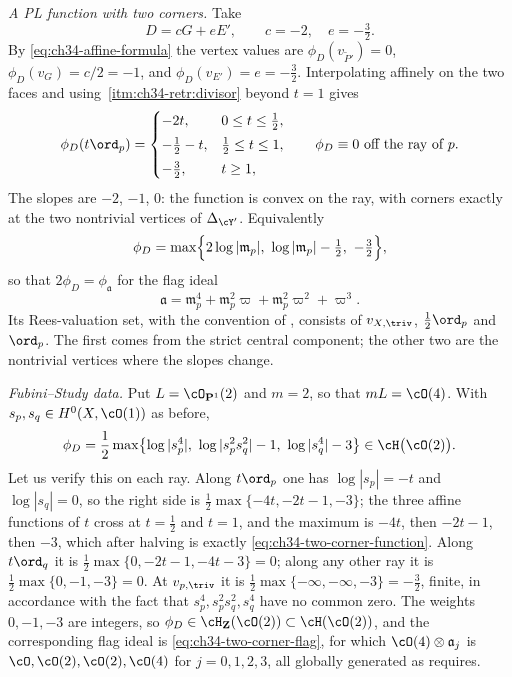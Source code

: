 \begin{example}
\emph{A PL function with two corners.}  Take
\[
 D=cG+eE',
 \qquad
 c=-2,\quad e=-\tfrac32 .
\]
By \eqref{eq:ch34-affine-formula} the vertex values are
$\phi_D(v_{\widetilde P'})=0$, $\phi_D(v_G)=c/2=-1$, and
$\phi_D(v_{E'})=e=-\tfrac32$.  Interpolating affinely on the two faces and
using \,\cref{itm:ch34-retr:divisor} beyond
$t=1$ gives
\begin{equation}
\label{eq:ch34-two-corner-function}
 \phi_D(t\ord_p)=
 \begin{cases}
 -2t,&0\le t\le\tfrac12,\\[1mm]
 -\tfrac12-t,&\tfrac12\le t\le1,\\[1mm]
 -\tfrac32,&t\ge1,
 \end{cases}
 \qquad
 \phi_D\equiv0\ \text{off the ray of }p .
\end{equation}
The slopes are $-2$, $-1$, $0$: the function is convex on the ray,
with corners exactly at the two nontrivial vertices of $\Delta_{\cY'}$.
Equivalently
\begin{equation}
\label{eq:ch34-two-corner-max}
 \phi_D=\max\Bigl\{2\log|\mathfrak m_p|,\
 \log|\mathfrak m_p|-\tfrac12,\ -\tfrac32\Bigr\},
\end{equation}
so that $2\phi_D=\phi_{\mathfrak a}$ for the flag ideal
\begin{equation}
\label{eq:ch34-two-corner-flag}
 \mathfrak a=\mathfrak m_p^4+\mathfrak m_p^2\varpi
 +\mathfrak m_p^2\varpi^2+\varpi^3 .
\end{equation}
Its Rees-valuation set, with the convention of
, consists of
$v_{X,\triv}$, $\tfrac12\ord_p$ and $\ord_p$.
The first comes from the strict central component; the other two are
the nontrivial vertices where the slopes change.

\emph{Fubini--Study data.}  Put $L=\cO_{\mathbf P^1}(2)$ and $m=2$, so
that $mL=\cO(4)$.  With $s_p,s_q\in H^0(X,\cO(1))$ as before,
\begin{equation}
\label{eq:ch34-two-corner-fs}
 \phi_D=\frac12\max\bigl\{
   \log|s_p^4|,\
   \log|s_p^2s_q^2|-1,\
   \log|s_q^4|-3\bigr\}
 \in\cH\bigl(\cO(2)\bigr).
\end{equation}
Let us verify this on each ray.  Along $t\ord_p$ one has
$\log|s_p|=-t$ and $\log|s_q|=0$, so the right side is
$\tfrac12\max\{-4t,-2t-1,-3\}$; the three affine functions of $t$ cross
at $t=\tfrac12$ and $t=1$, and the maximum is $-4t$, then
$-2t-1$, then $-3$, which after halving is exactly
\eqref{eq:ch34-two-corner-function}.  Along $t\ord_q$ it is
$\tfrac12\max\{0,-2t-1,-4t-3\}=0$; along any other ray it is
$\tfrac12\max\{0,-1,-3\}=0$.  At $v_{p,\triv}$ it is
$\tfrac12\max\{-\infty,-\infty,-3\}=-\tfrac32$, finite, in accordance with
the fact that $s_p^4,s_p^2s_q^2,s_q^4$ have no common zero.  The weights
$0,-1,-3$ are integers, so
$\phi_D\in\cH_{\mathbf Z}(\cO(2))\subset\cH(\cO(2))$, and the
corresponding flag ideal is \eqref{eq:ch34-two-corner-flag}, for which
$\cO(4)\otimes\mathfrak a_j$ is
$\cO,\cO(2),\cO(2),\cO(4)$ for $j=0,1,2,3$, all globally generated as
\Cref{prop:ch34-fs-flag-ideal} requires.
\end{example}

